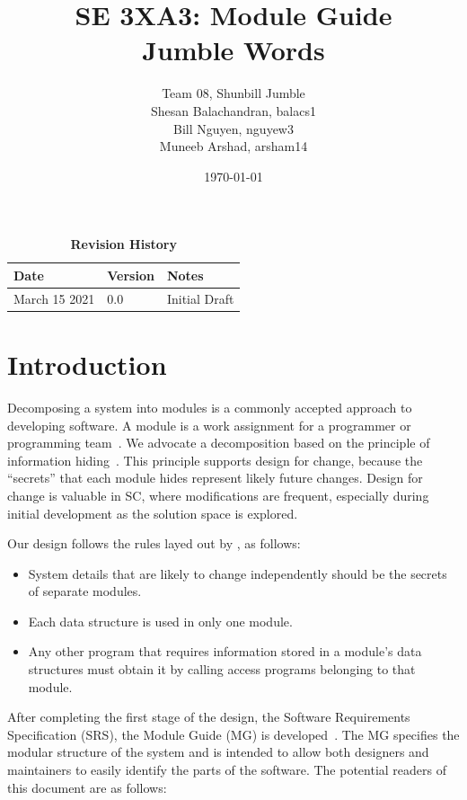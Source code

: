 \documentclass[12pt, titlepage]{article}
\title{SE 3XA3: Module Guide\\Jumble Words}
\author{Team 08, Shunbill Jumble
	\\Shesan Balachandran, balacs1
	\\Bill Nguyen, nguyew3
	\\Muneeb Arshad, arsham14
}
\date{\today}
\begin{document}
\maketitle

\clearpage
\begin{table}[bp]
	\caption{\bf Revision History}
	\begin{tabularx}{\textwidth}{p{3cm}p{2cm}X}
		\toprule {\bf Date} & {\bf Version} & {\bf Notes}\\
		\midrule
		March 15 2021 & 0.0 & Initial Draft\\
		\bottomrule
	\end{tabularx}
\end{table}
\clearpage
{}
\tableofcontents
\listoftables
\listoffigures



\newpage


\section{Introduction}

Decomposing a system into modules is a commonly accepted approach to developing
software.  A module is a work assignment for a programmer or programming
team~\citep{ParnasEtAl1984}.  We advocate a decomposition
based on the principle of information hiding~\citep{Parnas1972a}.  This
principle supports design for change, because the ``secrets'' that each module
hides represent likely future changes.  Design for change is valuable in SC,
where modifications are frequent, especially during initial development as the
solution space is explored.  

Our design follows the rules layed out by \citet{ParnasEtAl1984}, as follows:
\begin{itemize}
\item System details that are likely to change independently should be the
  secrets of separate modules.
\item Each data structure is used in only one module.
\item Any other program that requires information stored in a module's data
  structures must obtain it by calling access programs belonging to that module.
\end{itemize}

After completing the first stage of the design, the Software Requirements
Specification (SRS), the Module Guide (MG) is developed~\citep{ParnasEtAl1984}. The MG
specifies the modular structure of the system and is intended to allow both
designers and maintainers to easily identify the parts of the software.  The
potential readers of this document are as follows:
\end{document}
